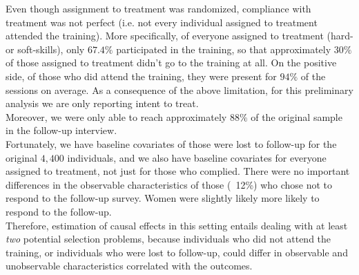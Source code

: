 Even though assignment to treatment was randomized, compliance with treatment was not perfect (i.e. not every individual assigned to treatment attended the training). More specifically, of everyone assigned to treatment (hard- or soft-skills), only $67.4\%$ participated in the training, so that approximately $30\%$ of those assigned to treatment didn't go to the training at all. On the positive side, of those who did attend the training, they were present for $94\%$ of the sessions on average. As a consequence of the above limitation, for this preliminary analysis we are only reporting intent to treat.\\

 Moreover, we were only able to reach approximately $88\%$ of the original sample in the follow-up interview. \\ 

Fortunately, we have baseline covariates of those were lost to follow-up for the original $4,400$ individuals, and we also have baseline covariates for everyone assigned to treatment, not just for those who complied.  There were no important differences in the observable characteristics of those (~12\%) who chose not to respond to the follow-up survey. Women were slightly likely more likely to respond to the follow-up.\\

Therefore, estimation of causal effects in this setting entails dealing with at least \textit{two} potential selection problems, because individuals who did not attend the training, or individuals who were lost to follow-up, could differ in observable and unobservable characteristics correlated with the outcomes. \\

